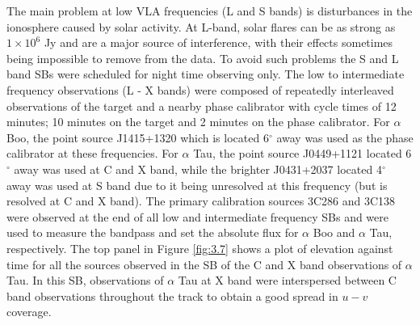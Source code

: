 The main problem at low VLA frequencies (L and S bands) is disturbances in the ionosphere caused by solar activity. At L-band, solar flares can be as strong as $1 \times 10^6$ Jy and are a major source of interference, with their effects sometimes being impossible to remove from the data. To avoid such problems the S and L band SBs were scheduled for night time observing only. The low to intermediate frequency observations (L - X bands) were composed of repeatedly interleaved observations of the target and a nearby phase calibrator with cycle times of 12 minutes; 10 minutes on the target and 2 minutes on the phase calibrator. For $\alpha$ Boo, the point source J1415+1320 which is located 6$^{\circ}$ away was used as the phase calibrator at these frequencies. For $\alpha$ Tau, the point source J0449+1121 located 6$^{\circ}$ away was used at C and X band, while the brighter J0431+2037 located 4$^{\circ}$ away was used at S band due to it being unresolved at this frequency (but is resolved at C and X band). The primary calibration sources 3C286 and 3C138 were observed at the end of all low and intermediate frequency SBs and were used to measure the bandpass and set the absolute flux for $\alpha$ Boo and $\alpha$ Tau, respectively. The top panel in Figure \ref{fig:3.7} shows a plot of elevation against time for all the sources observed in the SB of the C and X band observations of $\alpha$ Tau. In this SB, observations of $\alpha$ Tau at X band were interspersed between C band observations throughout the track to obtain a good spread in $u-v$ coverage. 

